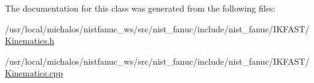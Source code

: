 The documentation for this class was generated from the following files\-:\begin{DoxyCompactItemize}
\item 
/usr/local/michalos/nistfanuc\-\_\-ws/src/nist\-\_\-fanuc/include/nist\-\_\-fanuc/\-I\-K\-F\-A\-S\-T/\hyperlink{IKFAST_2Kinematics_8h}{Kinematics.\-h}\item 
/usr/local/michalos/nistfanuc\-\_\-ws/src/nist\-\_\-fanuc/include/nist\-\_\-fanuc/\-I\-K\-F\-A\-S\-T/\hyperlink{include_2nist__fanuc_2IKFAST_2Kinematics_8cpp}{Kinematics.\-cpp}\end{DoxyCompactItemize}
